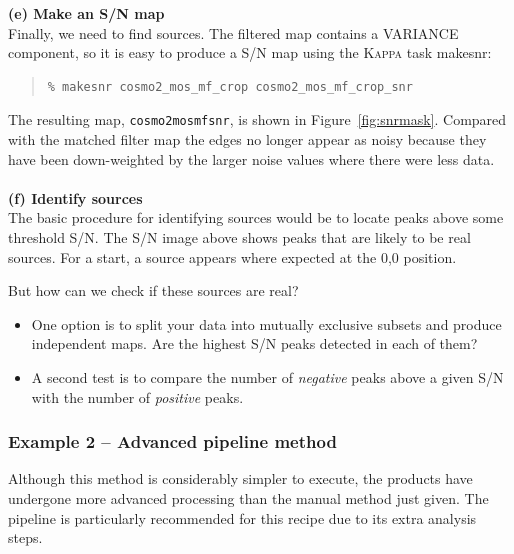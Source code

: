 \documentclass[twoside,11pt]{article}
\newcommand{\htmlref}[2]{#1}
\newcommand{\latexhtml}[2]{#1}
\newcommand{\xref}[3]{#1}
\renewcommand{\_}{\texttt{\symbol{95}}}
\newenvironment{myquote}{
   \color{MidnightBlue}\begin{quote}\begin{small}}{
   \end{small}\end{quote}
}
\newcommand{\task}[1]{\textsf{#1}}
\newcommand{\file}[1]{\texttt{#1}}
\newcommand{\makesnr}{\xref{\task{makesnr}}{sun95}{MAKESNR}}
\newcommand{\cref}[3]{\latexhtml{#1~\ref{#2}}{\htmlref{#3}{#2}}}
\renewenvironment{myquote}{
      \begin{quote}\begin{small}}{
      \end{small}\end{quote}
   }
\begin{document}
\textbf{(e) Make an S/N map}\\
Finally, we need to find sources. The filtered map contains a
VARIANCE component, so it is easy to produce a S/N map using the
\textsc{Kappa} task \makesnr:
\begin{myquote}
\begin{verbatim}
% makesnr cosmo2_mos_mf_crop cosmo2_mos_mf_crop_snr
\end{verbatim}
\end{myquote}

The resulting map, \file{cosmo2\_mos\_mf\_snr}, is shown in
\cref{Figure}{fig:snrmask}{the signal-to-noise image}. Compared with the
matched filter map the
edges no longer appear as noisy because they have been down-weighted
by the larger noise values where there were less data.
\\ \\
\textbf{(f) Identify sources}\\
The basic procedure for identifying sources would be to locate peaks
above some threshold S/N. The S/N image above shows peaks that are
likely to be real sources. For a start, a source appears where
expected at the 0,0 position.

But how can we check if these sources are real?
\begin{itemize}

\item One option is to split your data into mutually exclusive subsets
  and produce independent maps. Are the highest S/N peaks detected in each of
  them?
\item A second test is to compare the number of \emph{negative} peaks above
  a given S/N with the number of \emph{positive} peaks.
\end{itemize}

\subsubsection{Example 2 -- Advanced pipeline method}
\label{sec:jk}

Although this method is considerably simpler to execute, the products
have undergone more advanced processing than the manual method just
given. The pipeline is particularly recommended for this recipe due to
its extra analysis steps.
\end{document}
